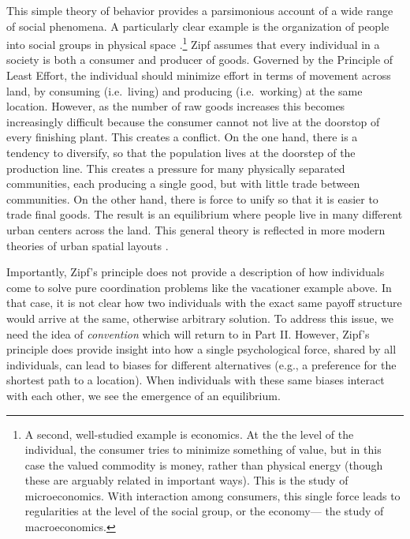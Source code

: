 \documentclass[man, noapacite, 12pt]{apa2}
\begin{document}
This simple theory of behavior provides a parsimonious account of a wide range of social phenomena. A particularly clear example is the organization of people into social  groups in physical space \cite{zipf1949human}.\footnote{A second, well-studied example is economics. At the the level of the individual, the consumer tries to minimize something of value, but in this case the valued commodity is money, rather than physical energy (though these are arguably related in important ways). This is the study of microeconomics. With interaction among consumers, this single force leads to regularities at the level of the social group, or the economy--- the study of macroeconomics.} Zipf assumes that every individual in a society is both a consumer and producer of goods. Governed by the Principle of Least Effort, the individual should minimize effort in terms of movement across land, by consuming (i.e.\ living) and producing (i.e.\ working) at the same location. However, as the number of raw goods increases this becomes increasingly difficult because the consumer cannot not live at the doorstop of every finishing plant. This creates a conflict. On the one hand, there is a tendency to diversify, so that the population lives at the doorstep of the production line. This creates a pressure for many physically separated communities, each producing a single good, but with little trade between communities. On the other hand, there is force to unify so that it is easier to trade final goods. The result is an equilibrium where people live in many different urban centers across the land. This general theory is reflected in more modern theories of urban spatial layouts \cite{mills1967aggregative, brueckner1987structure}.

Importantly, Zipf's principle does not provide a description of how individuals come to solve pure coordination problems like the vacationer example above. In that case, it is not clear how two individuals with the exact same payoff structure would arrive at the same, otherwise arbitrary solution. To address this issue, we need the idea of {\it convention} which will return to in Part II. However, Zipf's principle does provide insight into how a single psychological force, shared by all individuals, can lead to biases for different alternatives (e.g., a preference for the shortest path to a location). When individuals with these same biases interact with each other, we see the emergence of an equilibrium. 
\end{document}
